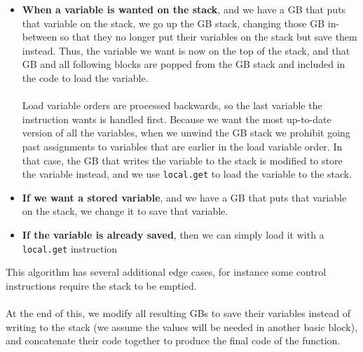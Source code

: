 \documentclass[12pt,twoside,notitlepage]{report}
\newcommand{\wainline}{\texttt}
\begin{document}
\begin{itemize}
	\item \textbf{When a variable is wanted on the stack}, and we have a GB that puts that variable on the stack, we go up the GB stack, changing those GB in-between so that they no longer put their variables on the stack but save them instead. Thus, the variable we want is now on the top of the stack, and that GB and all following blocks are popped from the GB stack and included in the code to load the variable.
	\\\\
	Load variable orders are processed backwards, so the last variable the instruction wants is handled first. Because we want the most up-to-date version of all the variables, when we unwind the GB stack we prohibit going past assignments to variables that are earlier in the load variable order. In that case, the GB that writes the variable to the stack is modified to store the variable instead, and we use \wainline{local.get} to load the variable to the stack.
	\item \textbf{If we want a stored variable}, and we have a GB that puts that variable on the stack, we change it to save that variable.
	\item \textbf{If the variable is already saved}, then we can simply load it with a \wainline{local.get} instruction
\end{itemize}
This algorithm has several additional edge cases, for instance some control instructions require the stack to be emptied.
\\\\
At the end of this, we modify all resulting GBs to save their variables instead of writing to the stack (we assume the values will be needed in another basic block), and concatenate their code together to produce the final code of the function.
\end{document}
